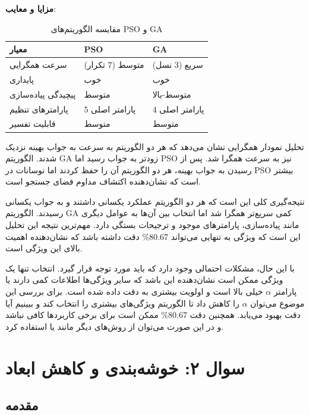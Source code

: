 \documentclass{article}
\begin{document}
\textbf{مزایا و معایب}:
\begin{table}[h!]
\centering
\begin{tabular}{|p{3cm}|p{5cm}|p{5cm}|}
\hline
\textbf{معیار} & \textbf{PSO} & \textbf{GA} \\
\hline
سرعت همگرایی & متوسط (7 تکرار) & سریع (3 نسل) \\
\hline
پایداری & خوب & خوب \\
\hline
پیچیدگی پیاده‌سازی & متوسط & متوسط-بالا \\
\hline
پارامترهای تنظیم & 5 پارامتر اصلی & 4 پارامتر اصلی \\
\hline
قابلیت تفسیر & متوسط & متوسط \\
\hline
\end{tabular}
\caption{مقایسه الگوریتم‌های PSO و GA}
\label{tab:q1_comparison}
\end{table}

تحلیل نمودار همگرایی نشان می‌دهد که هر دو الگوریتم به سرعت به جواب بهینه نزدیک شدند. الگوریتم GA زودتر به جواب رسید اما PSO نیز به سرعت همگرا شد. پس از رسیدن به جواب بهینه، هر دو الگوریتم آن را حفظ کردند اما نوسانات در PSO بیشتر است که نشان‌دهنده اکتشاف مداوم فضای جستجو است.

نتیجه‌گیری کلی این است که هر دو الگوریتم عملکرد یکسانی داشتند و به جواب یکسانی رسیدند. الگوریتم GA کمی سریع‌تر همگرا شد اما انتخاب بین آن‌ها به عوامل دیگری مانند پیاده‌سازی، پارامترهای موجود و ترجیحات بستگی دارد. مهم‌ترین نتیجه این تحلیل این است که ویژگی  به تنهایی می‌تواند 80.67\% دقت داشته باشد که نشان‌دهنده اهمیت بالای این ویژگی است.

با این حال، مشکلات احتمالی وجود دارد که باید مورد توجه قرار گیرد. انتخاب تنها یک ویژگی ممکن است نشان‌دهنده این باشد که سایر ویژگی‌ها اطلاعات کمی دارند یا پارامتر $\alpha$ خیلی بالا است و اولویت بیشتری به دقت داده شده است. برای بررسی این موضوع می‌توان $\alpha$ را کاهش داد تا الگوریتم ویژگی‌های بیشتری را انتخاب کند و ببینیم آیا دقت بهبود می‌یابد. همچنین دقت 80.67\% ممکن است برای برخی کاربردها کافی نباشد و در این صورت می‌توان از روش‌های دیگر مانند  یا  استفاده کرد.

\section{سوال ۲: خوشه‌بندی و کاهش ابعاد}\label{sec:q2}

\subsection{مقدمه}
\end{document}
